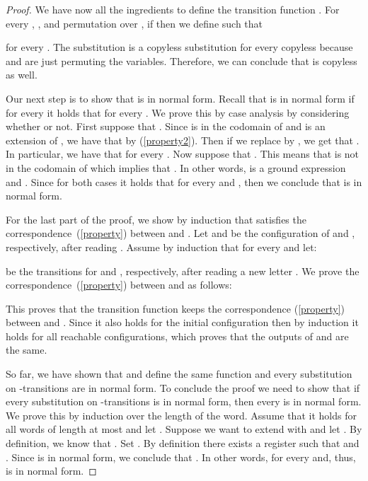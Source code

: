 \begin{proof}
We have now all the ingredients to define the transition function . For every , , and permutation  over , if  then we define  such that

for every .
The substitution   is a copyless substitution for every copyless  because  and  are just permuting the variables. 
Therefore, we can conclude that  is copyless as well.

Our next step is to show that  is in normal form.
Recall that  is in normal form if for every  it holds that  for every .
We prove this by case analysis by considering whether  or not.
First suppose that . 
Since  is in the codomain of  and  is an extension of , we have that  by (\ref{property2}). 
Then if we replace  by , we get that .
In particular, we have that  for every .
Now suppose that .
This means that  is not in the codomain of  which implies that .
In other words,  is a ground expression and .
Since for both cases it holds that  for every  and , then we conclude that  is in normal form. 

For the last part of the proof, we show by induction that  satisfies the correspondence~(\ref{property}) between  and .
Let  and  be the configuration of  and , respectively, after reading . Assume by induction that  for every  and let:

be the transitions for  and , respectively,  after reading a new letter . 
We prove the correspondence~(\ref{property}) between  and  as follows:

This proves that the transition function  keeps the correspondence (\ref{property}) between  and . Since it also holds for the initial configuration then by induction it holds for all reachable configurations, which proves that the outputs of  and  are the same. 

So far, we have shown that  and  define the same function and every substitution on -transitions are in normal form. To conclude the proof we need to show that if every substitution on -transitions is in normal form, then every  is in normal form. We prove this by induction over the length of the word.
Assume that it holds for all words  of length at most  and let . Suppose we want to extend  with  and let . By definition, we know that . Set . By definition there exists a register  such that  and . Since  is in normal form, we conclude that . In other words,  for every  and, thus,  is in normal form. 	
\end{proof}





